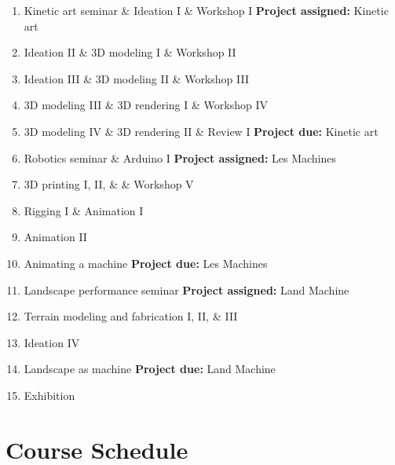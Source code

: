 \documentclass[11pt,article,oneside]{memoir}
\begin{document}
\begin{enumerate}
%
\item Kinetic art seminar \& Ideation I \& Workshop I \textbf{Project assigned:} Kinetic art %
\item Ideation II \& 3D modeling I \& Workshop II%
\item Ideation III \& 3D modeling II \& Workshop III
\item 3D modeling III \& 3D rendering I \& Workshop IV
\item 3D modeling IV \& 3D rendering II \& Review I \textbf{Project due:} Kinetic art
%
\item Robotics seminar \& Arduino I  \textbf{Project assigned:} Les Machines %
\item 3D printing I, II, \& \& Workshop V
\item Rigging I \& Animation I
\item Animation II
\item Animating a machine \textbf{Project due:} Les Machines %
%
\item Landscape performance seminar \textbf{Project assigned:} Land Machine
\item Terrain modeling and fabrication I, II, \& III %
\item Ideation IV
\item Landscape as machine \textbf{Project due:} Land Machine
%
\item Exhibition
%
\end{enumerate}


\section{Course Schedule}
\end{document}
